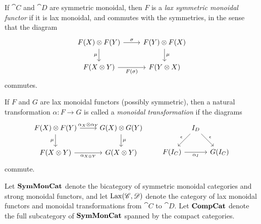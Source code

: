 \documentclass[12pt,oneside,article,draft]{memoir}
\begin{document}
If $\cat{C}$ and $\cat{D}$ are symmetric monoidal, then $F$ is a \emph{lax symmetric monoidal functor} if it is lax monoidal, and commutes with the symmetries, in the sense that the diagram
\[
\begin{tikzcd}
	F(X)\otimes F(Y)
		\rar{\sigma}
		\dar[swap]{\mu}
	& F(Y)\otimes F(X)
		\dar{\mu} \\
	F(X\otimes Y)
		\rar[swap]{F(\sigma)}
	& F(Y\otimes X)
\end{tikzcd}
\]
commutes.

If $F$ and $G$ are lax monoidal functors (possibly symmetric), then a natural transformation $\alpha\colon F\to G$ is called a \emph{monoidal transformation} if the diagrams
\[
\begin{tikzcd}
	F(X)\otimes F(Y)
		\rar{\alpha_X\otimes\alpha_Y}
		\dar[swap]{\mu}
	& G(X)\otimes G(Y)
		\dar{\mu} \\
	F(X\otimes Y)
		\rar[swap]{\alpha_{X\otimes Y}}
	& G(X\otimes Y)
\end{tikzcd}
\qquad
\begin{tikzcd}[column sep=tiny]
	{} & I_D \dlar[swap]{\epsilon} \drar{\epsilon} & \\
	F(I_C) \ar{rr}[swap]{\alpha_I} && G(I_C)
\end{tikzcd}
\]
commute.

Let $\mathbf{SymMonCat}$ denote the bicategory of symmetric monoidal categories and strong monoidal functors, and let $\operatorname{Lax}(\mathscr{C},\mathscr{D})$ denote the category of lax monoidal functors and monoidal transformations from $\cat{C}$ to $\cat{D}$. Let $\mathbf{CompCat}$ denote the full subcategory of $\mathbf{SymMonCat}$ spanned by the compact categories.
\end{document}
